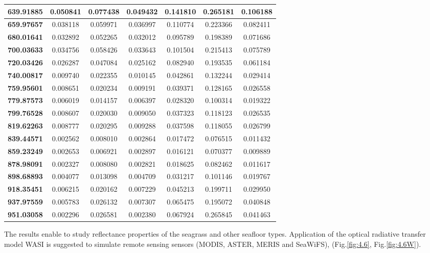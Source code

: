 \documentclass[11pt]{article}
\begin{document}
\begin{table}[htbp]
\begin{center}
\begin{tabular}{|c|c|c|c|c|c|c|}
		\textbf{639.91885} & 0.050841 & 0.077438 & 0.049432 & 0.141810 & 0.265181 & 0.106188 \\ \hline
		\textbf{659.97657} & 0.038118 & 0.059971 & 0.036997 & 0.110774 & 0.223366 & 0.082411 \\ \hline
		\textbf{680.01641} & 0.032892 & 0.052265 & 0.032012 & 0.095789 & 0.198389 & 0.071686 \\ \hline
		\textbf{700.03633} & 0.034756 & 0.058426 & 0.033643 & 0.101504 & 0.215413 & 0.075789 \\ \hline
		\textbf{720.03426} & 0.026287 & 0.047084 & 0.025162 & 0.082940 & 0.193535 & 0.061184 \\ \hline
		\textbf{740.00817} & 0.009740 & 0.022355 & 0.010145 & 0.042861 & 0.132244 & 0.029414 \\ \hline
		\textbf{759.95601} & 0.008651 & 0.020234 & 0.009191 & 0.039371 & 0.128165 & 0.026558 \\ \hline
		\textbf{779.87573} & 0.006019 & 0.014157 & 0.006397 & 0.028320 & 0.100314 & 0.019322 \\ \hline
		\textbf{799.76528} & 0.008607 & 0.020030 & 0.009050 & 0.037323 & 0.118123 & 0.026535 \\ \hline
		\textbf{819.62263} & 0.008777 & 0.020295 & 0.009288 & 0.037598 & 0.118055 & 0.026799 \\ \hline
		\textbf{839.44571} & 0.002562 & 0.008010 & 0.002864 & 0.017472 & 0.076515 & 0.011432 \\ \hline
		\textbf{859.23249} & 0.002653 & 0.006921 & 0.002897 & 0.016121 & 0.070377 & 0.009889 \\ \hline
		\textbf{878.98091} & 0.002327 & 0.008080 & 0.002821 & 0.018625 & 0.082462 & 0.011617 \\ \hline
		\textbf{898.68893} & 0.004077 & 0.013098 & 0.004709 & 0.031217 & 0.101146 & 0.019767 \\ \hline
		\textbf{918.35451} & 0.006215 & 0.020162 & 0.007229 & 0.045213 & 0.199711 & 0.029950 \\ \hline
		\textbf{937.97559} & 0.005783 & 0.026132 & 0.007307 & 0.065475 & 0.195072 & 0.040848 \\ \hline
		\textbf{951.03058} & 0.002296 & 0.026581 & 0.002380 & 0.067924 & 0.265845 & 0.041463 \\ \hline
	\end{tabular}
	\end{center}
\end{table}

The results enable to study reflectance properties of the seagrass and other
seafloor types. Application of the optical radiative transfer model WASI is suggested to simulate
remote sensing sensors (\ac{MODIS}, \ac{ASTER}, \ac{MERIS} and \ac{SeaWiFS}), (Fig.\ref{fig:4.6}, Fig.\ref{fig:4.6W}).
\end{document}
